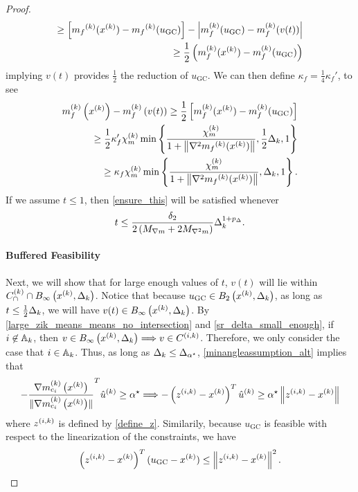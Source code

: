 \begin{proof}
\begin{align*}
 \ge \left[{{m}_f}^{(k)}(x^{(k)}) - {{m}_f}^{(k)}(u_{\textrm{GC}})\right] - \left|m_f^{(k)}(u_{\textrm{GC}}) - m_f^{(k)}(v(t)) \right| \nonumber \\
\ge \frac 1 2 \left(m_f^{(k)}(x^{(k)}) - m_f^{(k)}(u_{\textrm{GC}})\right)
\end{align*}
implying $v(t)$ provides $\frac 1 2$ the reduction of $u_{\textrm{GC}}$.
We can then define $\kappa_f = \frac 1 4 \kappa_f'$, to see
\begin{align*}
m_f^{(k)}\left(x^{(k)}\right) - m_f^{(k)}\left(v(t)\right)
\ge \frac 1 2 \left[m_f^{(k)}(x^{(k)}) - m_f^{(k)}(u_{\textrm{GC}})\right] \\
\ge \frac 1 2 \kappa_f' {\chi_m^{(k)}} \min\left\{ \frac{{\chi_m^{(k)}}}{1+\left\|\nabla^2 {{m}_f}^{(k)}(x^{(k)})\right\|}, \frac 1 2 \Delta_k, 1 \right\} \\
\ge \kappa_f {\chi_m^{(k)}} \min\left\{ \frac{{\chi_m^{(k)}}}{1+\left\|\nabla^2 {{m}_f}^{(k)}(x^{(k)})\right\|}, \Delta_k, 1 \right\}.
\end{align*}
If we assume $t \le 1$, then \cref{ensure_this} will be satisfied whenever
\begin{align*}
t \le \frac {\delta_2}{2\left({M_{\nabla m}} + 2{M_{\nabla^2 m}}\right)} \Delta_k^{1 + p_{\Delta}}.
\end{align*}




\paragraph*{Buffered Feasibility}
Next, we will show that for large enough values of $t$, $v(t)$ will lie within ${C^{(k)}_{\cap}} \cap { B_{\infty}\left(x^{(k)}, \Delta_k\right) }$.
Notice that because $u_{\textrm{GC}} \in B_2\left(x^{(k)}, \Delta_k\right)$, as long as $t \le \frac 1 2 \Delta_k$, we will have $v(t) \in { B_{\infty}\left(x^{(k)}, \Delta_k\right) }$.
By \cref{large_zik_means_means_no_intersection} and \cref{sr_delta_small_enough}, if $i \not \in {\mathbb A_{k}}$, then $v \in { B_{\infty}\left(x^{(k)}, \Delta_k\right) } \Longrightarrow v \in {C^{(i, k)}}$.
Therefore, we only consider the case that $i \in {\mathbb A_{k}}$.
Thus, as long as $\Delta_k \le {\Delta_{\alpha^{\star}}}$, \cref{minangleassumption_alt} implies that
\begin{align}
-\frac {{\nabla m_{c_i}^{(k)}\left(x^{(k)}\right)}}{\|{\nabla m_{c_i}^{(k)}\left(x^{(k)}\right)}\|} ^T{{\hat u}^{(k)}} \ge { \alpha^{\star} } \Longrightarrow -\left({z^{(i, k)}} - x^{(k)}\right)^T{{\hat u}^{(k)}} \ge { \alpha^{\star} } \left\|{z^{(i, k)}} - x^{(k)}\right\| \label{u_is_feasible}
\end{align}
where ${z^{(i, k)}}$ is defined by \cref{define_z}.
Similarily, because $u_{\textrm{GC}}$ is feasible with respect to the linearization of the constraints, we have
\begin{align}
\left({z^{(i, k)}} - x^{(k)}\right)^T(u_{\textrm{GC}} - x^{(k)}) \le \left\|{z^{(i, k)}} - x^{(k)}\right\|^2. \label{gc_is_feasible}
\end{align}


\end{proof}
